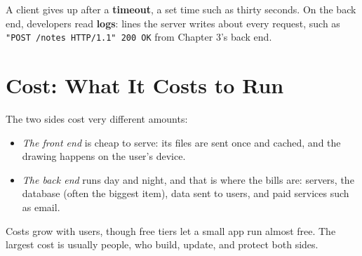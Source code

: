 A client gives up after a \textbf{timeout}, a set time such as thirty seconds. On the back end, developers read \textbf{logs}: lines the server writes about every request, such as \texttt{"POST\ /}\allowbreak{}\texttt{notes\ HTTP/}\allowbreak{}\texttt{1.}\allowbreak{}\texttt{1"\ 200\ OK} from Chapter 3's back end.

\section{Cost: What It Costs to Run}\label{05-security-speed-failure-cost:cost-what-it-costs-to-run}

The two sides cost very different amounts:

\begin{itemize}
\tightlist
\item
  \emph{The front end} is cheap to serve: its files are sent once and cached, and the drawing happens on the user's device.
\item
  \emph{The back end} runs day and night, and that is where the bills are: servers, the database (often the biggest item), data sent to users, and paid services such as email.
\end{itemize}

Costs grow with users, though free tiers let a small app run almost free. The largest cost is usually people, who build, update, and protect both sides.
